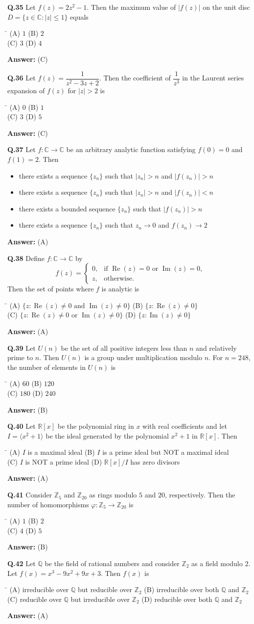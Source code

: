 \documentclass[11pt,a4paper]{article}
\newcommand{\optsfourA}[4]{%
  \begin{tabbing}
    \hspace{0.48\linewidth}\=\kill
    (A) #1 \> (B) #2 \\[2pt]
    (C) #3 \> (D) #4
  \end{tabbing}%
}
\newcommand{\optslistA}[4]{%
  \begin{itemize}
    \setlength{\itemsep}{2pt}\setlength{\parskip}{0pt}
    \item[(A)] #1
    \item[(B)] #2
    \item[(C)] #3
    \item[(D)] #4
  \end{itemize}%
}
\newcommand{\ans}[1]{\textbf{Answer:} #1\par\medskip}
\begin{document}
\textbf{Q.35} Let $f(z) = 2z^2 - 1$. Then the maximum value of $|f(z)|$ on the unit disc $D = \{z \in \mathbb{C} : |z| \le 1\}$ equals
\optsfourA{$1$}{$2$}{$3$}{$4$}
\ans{(C)}

\textbf{Q.36} Let $f(z) = \dfrac{1}{z^2 - 3z + 2}$. Then the coefficient of $\dfrac{1}{z^3}$ in the Laurent series expansion of $f(z)$ for $|z| > 2$ is
\optsfourA{$0$}{$1$}{$3$}{$5$}
\ans{(C)}

\textbf{Q.37} Let $f : \mathbb{C} \to \mathbb{C}$ be an arbitrary analytic function satisfying $f(0) = 0$ and $f(1) = 2$. Then
\optslistA{there exists a sequence $\{z_n\}$ such that $|z_n| > n$ and $|f(z_n)| > n$}{there exists a sequence $\{z_n\}$ such that $|z_n| > n$ and $|f(z_n)| < n$}{there exists a bounded sequence $\{z_n\}$ such that $|f(z_n)| > n$}{there exists a sequence $\{z_n\}$ such that $z_n \to 0$ and $f(z_n) \to 2$}
\ans{(A)}

\textbf{Q.38} Define $f : \mathbb{C} \to \mathbb{C}$ by
\[
  f(z) = \begin{cases} 0, & \text{if } \operatorname{Re}(z) = 0 \text{ or } \operatorname{Im}(z) = 0, \\ z, & \text{otherwise.} \end{cases}
\]
Then the set of points where $f$ is analytic is
\optsfourA{$\{z : \operatorname{Re}(z) \ne 0 \text{ and } \operatorname{Im}(z) \ne 0\}$}{$\{z : \operatorname{Re}(z) \ne 0\}$}{$\{z : \operatorname{Re}(z) \ne 0 \text{ or } \operatorname{Im}(z) \ne 0\}$}{$\{z : \operatorname{Im}(z) \ne 0\}$}
\ans{(A)}

\textbf{Q.39} Let $U(n)$ be the set of all positive integers less than $n$ and relatively prime to $n$. Then $U(n)$ is a group under multiplication modulo $n$. For $n = 248$, the number of elements in $U(n)$ is
\optsfourA{$60$}{$120$}{$180$}{$240$}
\ans{(B)}

\textbf{Q.40} Let $\mathbb{R}[x]$ be the polynomial ring in $x$ with real coefficients and let $I = \langle x^2 + 1 \rangle$ be the ideal generated by the polynomial $x^2 + 1$ in $\mathbb{R}[x]$. Then
\optsfourA{$I$ is a maximal ideal}{$I$ is a prime ideal but NOT a maximal ideal}{$I$ is NOT a prime ideal}{$\mathbb{R}[x]/I$ has zero divisors}
\ans{(A)}

\textbf{Q.41} Consider $\mathbb{Z}_5$ and $\mathbb{Z}_{20}$ as rings modulo $5$ and $20$, respectively. Then the number of homomorphisms $\varphi : \mathbb{Z}_5 \to \mathbb{Z}_{20}$ is
\optsfourA{$1$}{$2$}{$4$}{$5$}
\ans{(B)}

\textbf{Q.42} Let $\mathbb{Q}$ be the field of rational numbers and consider $\mathbb{Z}_2$ as a field modulo $2$. Let $f(x) = x^3 - 9x^2 + 9x + 3$. Then $f(x)$ is
\optsfourA{irreducible over $\mathbb{Q}$ but reducible over $\mathbb{Z}_2$}{irreducible over both $\mathbb{Q}$ and $\mathbb{Z}_2$}{reducible over $\mathbb{Q}$ but irreducible over $\mathbb{Z}_2$}{reducible over both $\mathbb{Q}$ and $\mathbb{Z}_2$}
\ans{(A)}
\end{document}
